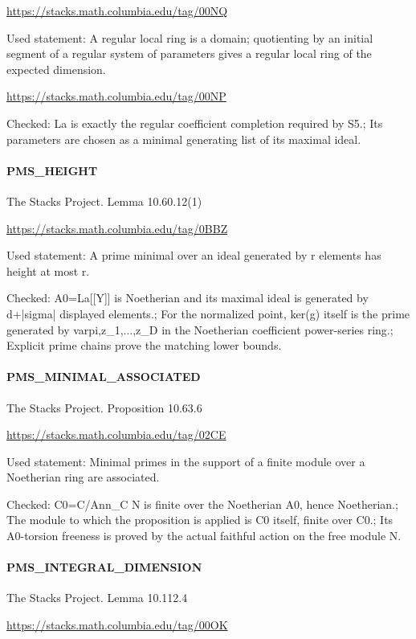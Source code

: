 \url{https://stacks.math.columbia.edu/tag/00NQ}

Used statement: A regular local ring is a domain; quotienting by an initial segment of a regular system of parameters gives a regular local ring of the expected dimension.

\url{https://stacks.math.columbia.edu/tag/00NP}

Checked: La is exactly the regular coefficient completion required by S5.; Its parameters are chosen as a minimal generating list of its maximal ideal.

\paragraph{PMS\_\allowbreak{}HEIGHT}The Stacks Project. Lemma 10.60.12(1)

\url{https://stacks.math.columbia.edu/tag/0BBZ}

Used statement: A prime minimal over an ideal generated by r elements has height at most r.

Checked: A0=La[[Y]] is Noetherian and its maximal ideal is generated by d+|sigma| displayed elements.; For the normalized point, ker(g) itself is the prime generated by varpi,z\_\allowbreak{}1,...,z\_\allowbreak{}D in the Noetherian coefficient power-series ring.; Explicit prime chains prove the matching lower bounds.

\paragraph{PMS\_\allowbreak{}MINIMAL\_\allowbreak{}ASSOCIATED}The Stacks Project. Proposition 10.63.6

\url{https://stacks.math.columbia.edu/tag/02CE}

Used statement: Minimal primes in the support of a finite module over a Noetherian ring are associated.

Checked: C0=C/\allowbreak{}Ann\_\allowbreak{}C N is finite over the Noetherian A0, hence Noetherian.; The module to which the proposition is applied is C0 itself, finite over C0.; Its A0-torsion freeness is proved by the actual faithful action on the free module N.

\paragraph{PMS\_\allowbreak{}INTEGRAL\_\allowbreak{}DIMENSION}The Stacks Project. Lemma 10.112.4

\url{https://stacks.math.columbia.edu/tag/00OK}

